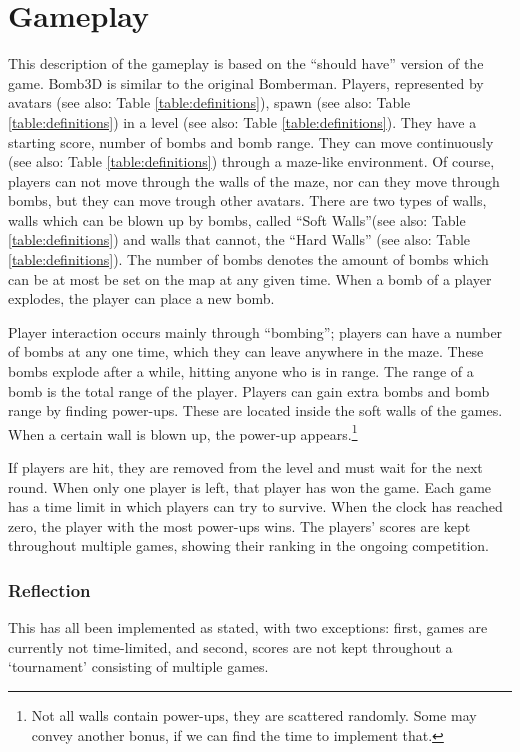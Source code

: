 \section{Gameplay}
This description of the gameplay is based on the ``should have'' version of the game. Bomb3D is similar to the original Bomberman. Players, represented by avatars (see also: Table \ref{table:definitions}), spawn (see also: Table \ref{table:definitions}) in a level (see also: Table \ref{table:definitions}). They have a starting score, number of bombs and bomb range. They can move continuously (see also: Table \ref{table:definitions}) through a maze-like environment. Of course, players can not move through the walls of the maze, nor can they move through bombs, but they can move trough other avatars. There are two types of walls, walls which can be blown up by bombs, called ``Soft Walls''(see also: Table \ref{table:definitions}) and walls that cannot, the ``Hard Walls'' (see also: Table \ref{table:definitions}). The number of bombs denotes the amount of bombs which can be at most be set on the map at any given time. When a bomb of a player explodes, the player can place a new bomb.

Player interaction occurs mainly through ``bombing''; players can have a number of bombs at any one time, which they can leave anywhere in the maze. These bombs explode after a while, hitting anyone who is in range. The range of a bomb is the total range of the player. Players can gain extra bombs and bomb range by finding power-ups. These are located inside the soft walls of the games. When a certain wall is blown up, the power-up appears.\footnote{Not all walls contain power-ups, they are scattered randomly. Some may convey another bonus, if we can find the time to implement that.}

If players are hit, they are removed from the level and must wait for the next round. When only one player is left, that player has won the game. Each game has a time limit in which players can try to survive. When the clock has reached zero, the player with the most power-ups wins. The players' scores are kept throughout multiple games, showing their ranking in the ongoing competition.

\subsubsection{Reflection}
This has all been implemented as stated, with two exceptions: first, games are currently not time-limited, and second, scores are not kept throughout a `tournament' consisting of multiple games.

